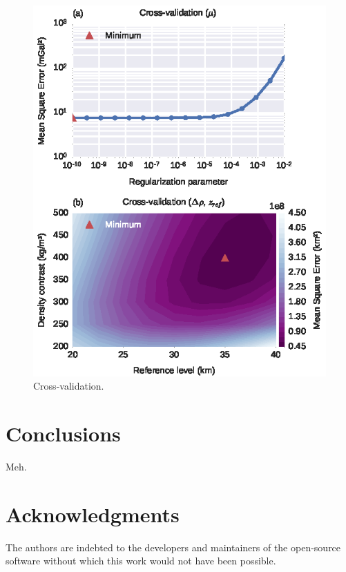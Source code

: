 \documentclass[extra,mreferee]{gji}
\begin{document}
\begin{figure}
    \centering
    \includegraphics{figures/south-america-cv}
    \caption{Cross-validation.}
    \label{fig:sam-cv}
\end{figure}



\section{Conclusions}

Meh.

\section{Acknowledgments}

The authors are indebted to the developers and maintainers of the open-source
software without which this work would not have been possible.



\end{document}

